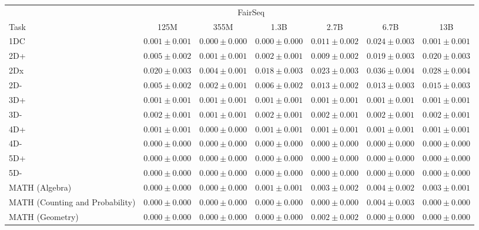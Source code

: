 \documentclass[11pt]{article}
\begin{document}
{\begin{landscape}
\begin{table}
\centering %
\begin{tabular}{l c c c c c c } \\ 
& \multicolumn{4}{c}{FairSeq} \\ 
Task & 125M & 355M & 1.3B & 2.7B & 6.7B & 13B \\ \toprule
1DC & $0.001 \pm 0.001$ & $0.000 \pm 0.000$ & $0.000 \pm 0.000$ & $0.011 \pm 0.002$ & $0.024 \pm 0.003$ & $0.001 \pm 0.001$ \\ 
2D+ & $0.005 \pm 0.002$ & $0.001 \pm 0.001$ & $0.002 \pm 0.001$ & $0.009 \pm 0.002$ & $0.019 \pm 0.003$ & $0.020 \pm 0.003$ \\ 
2Dx & $0.020 \pm 0.003$ & $0.004 \pm 0.001$ & $0.018 \pm 0.003$ & $0.023 \pm 0.003$ & $0.036 \pm 0.004$ & $0.028 \pm 0.004$ \\ 
2D- & $0.005 \pm 0.002$ & $0.002 \pm 0.001$ & $0.006 \pm 0.002$ & $0.013 \pm 0.002$ & $0.013 \pm 0.003$ & $0.015 \pm 0.003$ \\ 
3D+ & $0.001 \pm 0.001$ & $0.001 \pm 0.001$ & $0.001 \pm 0.001$ & $0.001 \pm 0.001$ & $0.001 \pm 0.001$ & $0.001 \pm 0.001$ \\ 
3D- & $0.002 \pm 0.001$ & $0.001 \pm 0.001$ & $0.002 \pm 0.001$ & $0.002 \pm 0.001$ & $0.002 \pm 0.001$ & $0.002 \pm 0.001$ \\ 
4D+ & $0.001 \pm 0.001$ & $0.000 \pm 0.000$ & $0.001 \pm 0.001$ & $0.001 \pm 0.001$ & $0.001 \pm 0.001$ & $0.001 \pm 0.001$ \\ 
4D- & $0.000 \pm 0.000$ & $0.000 \pm 0.000$ & $0.000 \pm 0.000$ & $0.000 \pm 0.000$ & $0.000 \pm 0.000$ & $0.000 \pm 0.000$ \\ 
5D+ & $0.000 \pm 0.000$ & $0.000 \pm 0.000$ & $0.000 \pm 0.000$ & $0.000 \pm 0.000$ & $0.000 \pm 0.000$ & $0.000 \pm 0.000$ \\ 
5D- & $0.000 \pm 0.000$ & $0.000 \pm 0.000$ & $0.000 \pm 0.000$ & $0.000 \pm 0.000$ & $0.000 \pm 0.000$ & $0.000 \pm 0.000$ \\ 
MATH (Algebra) & $0.000 \pm 0.000$ & $0.000 \pm 0.000$ & $0.001 \pm 0.001$ & $0.003 \pm 0.002$ & $0.004 \pm 0.002$ & $0.003 \pm 0.001$ \\ 
MATH (Counting and Probability) & $0.000 \pm 0.000$ & $0.000 \pm 0.000$ & $0.000 \pm 0.000$ & $0.000 \pm 0.000$ & $0.004 \pm 0.003$ & $0.000 \pm 0.000$ \\ 
MATH (Geometry) & $0.000 \pm 0.000$ & $0.000 \pm 0.000$ & $0.000 \pm 0.000$ & $0.002 \pm 0.002$ & $0.000 \pm 0.000$ & $0.000 \pm 0.000$ \\ 

\end{tabular}
\end{table}
\end{landscape}}
\end{document}
